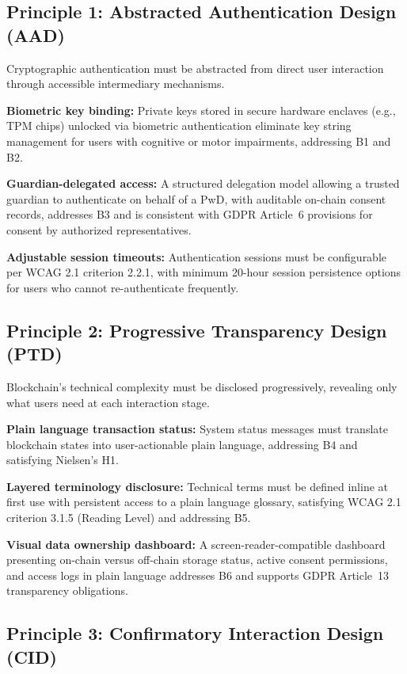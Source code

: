 \documentclass[journal,onecolumn]{IEEEtran}
\begin{document}
\subsection{Principle 1: Abstracted Authentication Design (AAD)}

Cryptographic authentication must be abstracted from direct user interaction through accessible intermediary mechanisms.

\textbf{Biometric key binding:} Private keys stored in secure hardware enclaves (e.g., TPM chips) unlocked via biometric authentication eliminate key string management for users with cognitive or motor impairments, addressing B1 and B2.

\textbf{Guardian-delegated access:} A structured delegation model allowing a trusted guardian to authenticate on behalf of a PwD, with auditable on-chain consent records, addresses B3 and is consistent with GDPR Article~6 provisions for consent by authorized representatives.

\textbf{Adjustable session timeouts:} Authentication sessions must be configurable per WCAG 2.1 criterion 2.2.1, with minimum 20-hour session persistence options for users who cannot re-authenticate frequently.

\subsection{Principle 2: Progressive Transparency Design (PTD)}

Blockchain's technical complexity must be disclosed progressively, revealing only what users need at each interaction stage.

\textbf{Plain language transaction status:} System status messages must translate blockchain states into user-actionable plain language, addressing B4 and satisfying Nielsen's H1.

\textbf{Layered terminology disclosure:} Technical terms must be defined inline at first use with persistent access to a plain language glossary, satisfying WCAG 2.1 criterion 3.1.5 (Reading Level) and addressing B5.

\textbf{Visual data ownership dashboard:} A screen-reader-compatible dashboard presenting on-chain versus off-chain storage status, active consent permissions, and access logs in plain language addresses B6 and supports GDPR Article~13 transparency obligations.

\subsection{Principle 3: Confirmatory Interaction Design (CID)}
\end{document}
